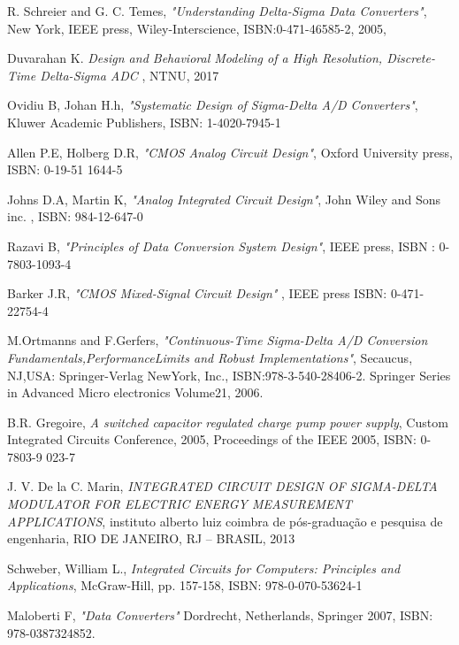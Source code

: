 


\begin{thebibliography}{9}

R. Schreier and G. C. Temes,
\textit{"Understanding Delta-Sigma Data Converters"},
New York,
IEEE press,
Wiley-Interscience,
ISBN:0-471-46585-2,
2005,

Duvarahan K. \textit{Design and Behavioral Modeling of a High Resolution, Discrete-Time Delta-Sigma ADC }, NTNU, 2017

Ovidiu B, Johan H.h, 
\textit{"Systematic Design of Sigma-Delta A/D Converters"},
Kluwer Academic Publishers,
ISBN: 1-4020-7945-1

Allen P.E,  Holberg D.R, 
\textit{"CMOS Analog Circuit Design"},
Oxford University press,
ISBN: 0-19-51 1644-5

Johns D.A, Martin K, 
\textit{"Analog Integrated Circuit Design"},
John Wiley and Sons inc. ,
ISBN: 984-12-647-0

Razavi B, 
\textit{"Principles of Data Conversion System Design"}, 
IEEE press,
ISBN : 0-7803-1093-4

Barker J.R,
\textit{"CMOS Mixed-Signal Circuit Design" },
IEEE press
ISBN: 0-471-22754-4

M.Ortmanns and F.Gerfers,
\textit{"Continuous-Time Sigma-Delta A/D Conversion
Fundamentals,PerformanceLimits and Robust Implementations"},
Secaucus,
NJ,USA:
Springer-Verlag
NewYork,
Inc.,
ISBN:978-3-540-28406-2.
Springer Series in Advanced Micro electronics
Volume21,
2006.

B.R. Gregoire,
\textit{A switched capacitor regulated charge pump power supply},
Custom Integrated Circuits Conference, 2005, Proceedings of the IEEE 2005,
ISBN: 0-7803-9 023-7

J. V. De la C. Marin,
\textit{INTEGRATED CIRCUIT DESIGN OF SIGMA-DELTA MODULATOR FOR
ELECTRIC ENERGY MEASUREMENT APPLICATIONS},
instituto alberto luiz coimbra de pós-graduação e pesquisa de engenharia,
RIO DE JANEIRO, RJ – BRASIL,
2013

Schweber, William L.,
\textit{Integrated Circuits for Computers: Principles and Applications},
McGraw-Hill, pp. 157-158,
ISBN: 978-0-070-53624-1

Maloberti F, 
\textit{"Data Converters"}
Dordrecht, Netherlands,
Springer 2007,
ISBN: 978-0387324852.


\end{thebibliography}
